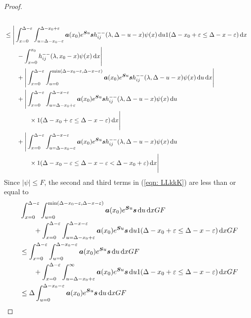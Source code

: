 \begin{proof}
\begin{align}
		\\&\leq \Bigg| \int_{x=0}^{\Delta-\varepsilon}\int_{u=\Delta-x_0-\varepsilon}^{\Delta-x_0+\varepsilon} \boldsymbol a (x_0)e^{\boldsymbol Su}\boldsymbol s h_{ij}^{--}(\lambda, \Delta - u - x) \psi(x) \, \mathrm{d} u 1(\Delta-x_0+\varepsilon\leq \Delta-x-\varepsilon) \, \mathrm{d} x\nonumber
		\\&\qquad{} - \int_{x=0}^{x_0} h_{ij}^{--}(\lambda, x_0 - x)\psi(x)\, \mathrm{d} x \Bigg| \nonumber 
		\\&\qquad {}+\Bigg|\int_{x=0}^{\Delta-\varepsilon}\int_{u=0}^{\min(\Delta-x_0-\varepsilon,\Delta-x-\varepsilon)} \boldsymbol a (x_0)e^{\boldsymbol Su}\boldsymbol s h_{ij}^{--}(\lambda, \Delta - u - x) \psi(x) \, \mathrm{d} u \, \mathrm{d} x\Bigg|\nonumber
		\\&\qquad {}+\Bigg|\int_{x=0}^{\Delta-\varepsilon}\int_{u=\Delta-x_0+\varepsilon}^{\Delta-x-\varepsilon} \boldsymbol a (x_0)e^{\boldsymbol Su}\boldsymbol s h_{ij}^{--}(\lambda, \Delta - u - x) \psi(x) \, \mathrm{d} u \nonumber 
		\\&\qquad\qquad \times1(\Delta-x_0+\varepsilon\leq \Delta - x -\varepsilon)\, \mathrm{d} x\Bigg|\nonumber
		\\&\qquad {}+\Bigg|\int_{x=0}^{\Delta-\varepsilon}\int_{u=\Delta-x_0-\varepsilon}^{\Delta-x-\varepsilon} \boldsymbol a (x_0)e^{\boldsymbol Su}\boldsymbol s h_{ij}^{--}(\lambda, \Delta - u - x) \psi(x) \, \mathrm{d} u \nonumber
		\\&\qquad\qquad \times 1(\Delta-x_0-\varepsilon\leq \Delta - x -\varepsilon < \Delta-x_0+\varepsilon)\, \mathrm{d} x\Bigg|   \label{eqn: LLkkK}
	\end{align}
	Since \(|\psi|\leq F\), the second and third terms in (\ref{eqn: LLkkK}) are less than or equal to 
	\begin{align}
		&\int_{x=0}^{\Delta-\varepsilon}\int_{u=0}^{\min(\Delta-x_0-\varepsilon,\Delta-x-\varepsilon)} \bs a (x_0)e^{\bs Su}\bs s  \wrt u \wrt xGF \nonumber
		\\&\qquad {}+\int_{x=0}^{\Delta-\varepsilon}\int_{u=\Delta-x_0+\varepsilon}^{\Delta-x-\varepsilon} \bs a (x_0)e^{\bs Su}\bs s  \wrt u 1(\Delta-x_0+\varepsilon\leq \Delta - x -\varepsilon)\wrt x GF \nonumber
		\\&\leq \int_{x=0}^{\Delta-\varepsilon}\int_{u=0}^{\Delta-x_0-\varepsilon} \bs a (x_0)e^{\bs Su}\bs s  \wrt u \wrt xGF \nonumber
		\\&\qquad {}+\int_{x=0}^{\Delta-\varepsilon}\int_{u=\Delta-x_0+\varepsilon}^{\infty} \bs a (x_0)e^{\bs Su}\bs s  \wrt u 1(\Delta-x_0+\varepsilon\leq \Delta - x -\varepsilon)\wrt x GF \nonumber
		\\&\leq\Delta\int_{u=0}^{\Delta-x_0-\varepsilon} \bs a (x_0)e^{\bs Su}\bs s  \wrt u \wrt xGF 

\end{align}
\end{proof}
